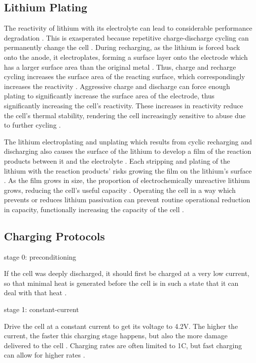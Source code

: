 \subsection{Lithium Plating}
The reactivity of lithium with its electrolyte can lead to considerable performance degradation \cite{HANDBOOK}. 
This is exasperated because repetitive charge-discharge cycling can permanently change the cell \cite{HANDBOOK}.
During recharging, as the lithium is forced back onto the anode, it electroplates, forming a surface layer onto the electrode which has a larger surface area than the original metal \cite{HANDBOOK}. 
Thus, charge and recharge cycling increases the surface area of the reacting surface, which correspondingly increases the reactivity \cite{HANDBOOK}. 
Aggressive charge and discharge can force enough plating to significantly increase the surface area of the electrode, thus significantly increasing the cell's reactivity.
These increases in reactivity reduce the cell's thermal stability, rendering the cell increasingly sensitive to abuse due to further cycling \cite{HANDBOOK}.

The lithium electroplating and unplating which results from cyclic recharging and discharging also causes the surface of the lithium to develop a film of the reaction products between it and the electrolyte \cite{HANDBOOK}. 
Each stripping and plating of the lithium with the reaction products' risks growing the film on the lithium's surface \cite{HANDBOOK}. 
As the film grows in size, the proportion of electrochemically unreactive lithium grows, reducing the cell's useful capacity \cite{HANDBOOK}.
Operating the cell in a way which prevents or reduces lithium passivation can prevent routine operational reduction in capacity, functionally increasing the capacity of the cell \cite{HANDBOOK}.

\subsection{Charging Protocols}

stage 0: preconditioning

If the cell was deeply discharged, it should first be charged at a very low current, so that minimal heat is generated before the cell is in such a state that it can deal with that heat \cite{DIGIKEY}.

stage 1: constant-current 

Drive the cell at a constant current to get its voltage to 4.2V. The higher the current, the faster this charging stage happens, but also the more damage delivered to the cell \cite{TI}. Charging rates are often limited to 1C, but fast charging can allow for higher rates \cite{TI}.

